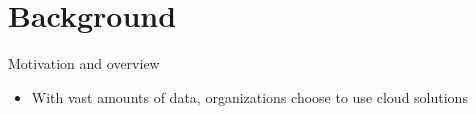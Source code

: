 

\section{Background}

	\begin{frame}{Motivation and overview}

		\begin{itemize}
			\item<1-> With vast amounts of data, organizations choose to use cloud solutions
		\end{itemize}

	\end{frame}

